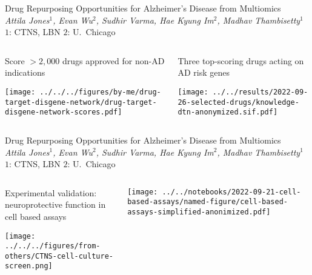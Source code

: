 \documentclass[aspectratio=169]{beamer}
\subtitle{A subtitle may be shorter and more technical}
\author{See poster \#97 for more details!}
\date{Attila Jones}
\begin{document}
\newcommand{\mytitle}{\large Drug Repurposing Opportunities for
	Alzheimer’s Disease from Multiomics\\
	\footnotesize{\emph{Attila Jones$^1$, Evan Wu$^2$, Sudhir Varma, Hae Kyung Im$^2$, Madhav Thambisetty$^1$}
\;$1$: CTNS, LBN $2$: U.~Chicago}}

\begin{frame}{\mytitle }

\begin{columns}[t]
\begin{column}{0.4\textwidth}
\begin{center}
	Score $>2,000$ drugs approved for non-AD indications
\end{center}

\texttt{[image: ../../../figures/by-me/drug-target-disgene-network/drug-target-disgene-network-scores.pdf]}
\end{column}

\begin{column}{0.6\textwidth}
\begin{center}
	Three top-scoring drugs acting on AD risk genes
\end{center}

\texttt{[image: ../../results/2022-09-26-selected-drugs/knowledge-dtn-anonymized.sif.pdf]}
\end{column}
\end{columns}
\end{frame}

\begin{frame}{\mytitle }
	

\begin{columns}[t]
\begin{column}{0.5\textwidth}
\begin{center}
	Experimental validation: neuroprotective function in cell based assays
\end{center}

\texttt{[image: ../../../figures/from-others/CTNS-cell-culture-screen.png]}
\end{column}

\begin{column}{0.5\textwidth}

\texttt{[image: ../../notebooks/2022-09-21-cell-based-assays/named-figure/cell-based-assays-simplified-anonimized.pdf]}
\end{column}
\end{columns}
\end{frame}
\end{document}
